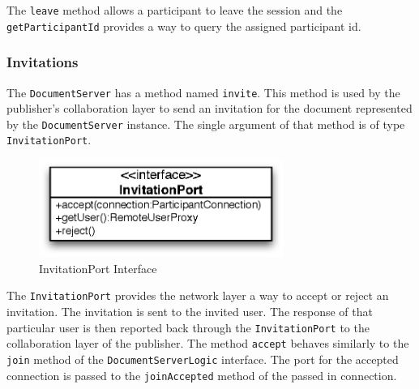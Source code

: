 The \texttt{leave} method allows a participant to leave the session and
the \texttt{getParticipantId} provides a way to query the assigned
participant id.


\subsubsection{Invitations}
\label{archoverview.net.invite}
The \texttt{DocumentServer} has a method named \texttt{invite}. This method
is used by the publisher's collaboration layer to send an invitation for the
document represented by the \texttt{DocumentServer} instance. The single
argument of that method is of type \texttt{InvitationPort}.

\begin{figure}[H]
 \centering
 \includegraphics[width=8.00cm,height=3.18cm]{../images/finalreport/architecture_invitationport_uml.eps}
 \caption{InvitationPort Interface}
\end{figure}

The \texttt{InvitationPort} provides the network layer a way to accept or
reject an invitation. The invitation is sent to the invited user. The response
of that particular user is then reported back through the 
\texttt{InvitationPort} to the collaboration layer of the publisher. The
method \texttt{accept} behaves similarly to the \texttt{join} method of
the \texttt{DocumentServerLogic} interface. The port for the accepted 
connection is passed to the \texttt{joinAccepted} method of the passed
in connection.

